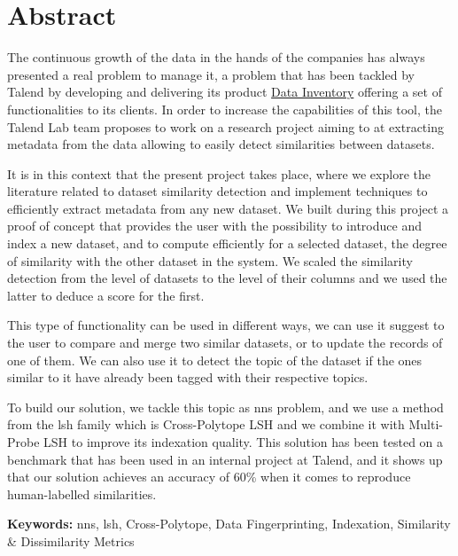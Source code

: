 \chapter*{Abstract}

The continuous growth of the data in the hands of the companies has always
presented a real problem to manage it, a problem that has been tackled by Talend
by developing and delivering its product
\href{https://www.talend.com/products/data-inventory/}{Data Inventory} offering
a set of functionalities to its clients. In order to increase the capabilities
of this tool, the Talend Lab team proposes to work on a research project aiming
to at extracting metadata from the data allowing to easily detect similarities
between datasets. 

It is in this context that the present project takes place, where we explore the
literature related to dataset similarity detection and implement techniques to
efficiently extract metadata from any new dataset. We built during this project
a proof of concept that provides the user with the possibility to introduce and
index a new dataset, and to compute efficiently for a selected dataset, the
degree of similarity with the other dataset in the system. We scaled the
similarity detection from the level of datasets to the level of their columns
and we used the latter to deduce a score for the first.

This type of functionality can be used in different ways, we can use it suggest
to the user to compare and merge two similar datasets, or to update the records
of one of them. We can also use it to detect the topic of the dataset if the
ones similar to it have already been tagged with their respective topics.

To build our solution, we tackle this topic as \acrfull{nns} problem, and we use
a method from the \acrfull{lsh} family which is Cross-Polytope LSH and we
combine it with Multi-Probe LSH to improve its indexation quality. This solution
has been tested on a benchmark that has been used in an internal project at
Talend, and it shows up that our solution achieves an accuracy of 60\% when it
comes to reproduce human-labelled similarities.

\vspace{2cm}
\textbf{Keywords:}
\acrlong{nns}, \acrlong{lsh}, Cross-Polytope, Data Fingerprinting, Indexation,
Similarity \& Dissimilarity Metrics